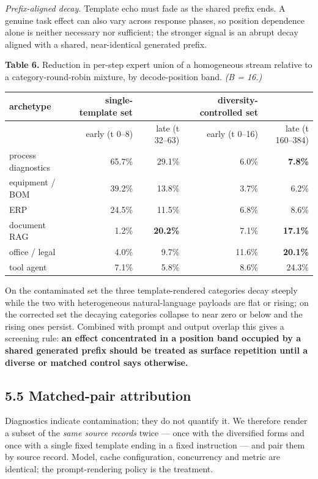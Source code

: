 \documentclass[
  10pt,
  letterpaper,
  10pt]{article}
\newcounter{none} %
\begin{document}
\emph{Prefix-aligned decay.} Template echo must fade as the shared
prefix ends. A genuine task effect can also vary across response phases,
so position dependence alone is neither necessary nor sufficient; the
stronger signal is an abrupt decay aligned with a shared, near-identical
generated prefix.

\textbf{Table 6.} Reduction in per-step expert union of a homogeneous
stream relative to a category-round-robin mixture, by decode-position
band. \emph{(B = 16.)}

{\def\LTcaptype{none} %
\begin{longtable}[]{@{}lrrrr@{}}
\toprule\noalign{}
archetype & single-template set & & diversity-controlled set & \\
\midrule\noalign{}
\endhead
\bottomrule\noalign{}
\endlastfoot
& early (t 0--8) & late (t 32--63) & early (t 0--16) & late (t
160--384) \\
process diagnostics & 65.7\% & 29.1\% & 6.0\% &
\textbf{\textminus{}7.8\%} \\
equipment / BOM & 39.2\% & 13.8\% & 3.7\% & 6.2\% \\
ERP & 24.5\% & 11.5\% & 6.8\% & \textminus{}8.6\% \\
document RAG & 1.2\% & \textbf{20.2\%} & 7.1\% & \textbf{17.1\%} \\
office / legal & 4.0\% & 9.7\% & 11.6\% & \textbf{20.1\%} \\
tool agent & 7.1\% & 5.8\% & \textminus{}8.6\% & 24.3\% \\
\end{longtable}
}

On the contaminated set the three template-rendered categories decay
steeply while the two with heterogeneous natural-language payloads are
flat or rising; on the corrected set the decaying categories collapse to
near zero or below and the rising ones persist. Combined with prompt and
output overlap this gives a screening rule: \textbf{an effect
concentrated in a position band occupied by a shared generated prefix
should be treated as surface repetition until a diverse or matched
control says otherwise.}

\subsection{5.5 Matched-pair
attribution}\label{matched-pair-attribution}

Diagnostics indicate contamination; they do not quantify it. We
therefore render a subset of the \emph{same source records} twice ---
once with the diversified forms and once with a single fixed template
ending in a fixed instruction --- and pair them by source record. Model,
cache configuration, concurrency and metric are identical; the
prompt-rendering policy is the treatment.
\end{document}
